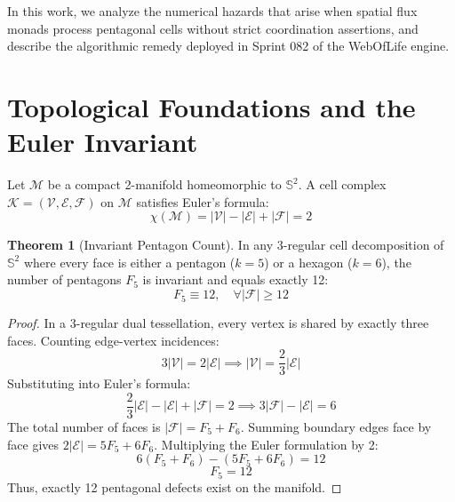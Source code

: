 \documentclass[10pt,twocolumn,letterpaper]{article}
\theoremstyle{definition}
\newtheorem{theorem}{Theorem}
\begin{document}
In this work, we analyze the numerical hazards that arise when spatial flux monads process pentagonal cells without strict coordination assertions, and describe the algorithmic remedy deployed in Sprint 082 of the WebOfLife engine.

\section{Topological Foundations and the Euler Invariant}

Let $\mathcal{M}$ be a compact 2-manifold homeomorphic to $\mathbb{S}^2$. A cell complex $\mathcal{K} = (\mathcal{V}, \mathcal{E}, \mathcal{F})$ on $\mathcal{M}$ satisfies Euler's formula:
\begin{equation}
\chi(\mathcal{M}) = |\mathcal{V}| - |\mathcal{E}| + |\mathcal{F}| = 2
\end{equation}

\begin{theorem}[Invariant Pentagon Count]
In any 3-regular cell decomposition of $\mathbb{S}^2$ where every face is either a pentagon ($k=5$) or a hexagon ($k=6$), the number of pentagons $F_5$ is invariant and equals exactly 12:
\begin{equation}
F_5 \equiv 12, \quad \forall |\mathcal{F}| \ge 12
\end{equation}
\end{theorem}

\begin{proof}
In a 3-regular dual tessellation, every vertex is shared by exactly three faces. Counting edge-vertex incidences:
\begin{equation}
3|\mathcal{V}| = 2|\mathcal{E}| \implies |\mathcal{V}| = \frac{2}{3}|\mathcal{E}|
\end{equation}
Substituting into Euler's formula:
\begin{equation}
\frac{2}{3}|\mathcal{E}| - |\mathcal{E}| + |\mathcal{F}| = 2 \implies 3|\mathcal{F}| - |\mathcal{E}| = 6
\end{equation}
The total number of faces is $|\mathcal{F}| = F_5 + F_6$. Summing boundary edges face by face gives $2|\mathcal{E}| = 5F_5 + 6F_6$. Multiplying the Euler formulation by 2:
\begin{equation}
6(F_5 + F_6) - (5F_5 + 6F_6) = 12
\end{equation}
\begin{equation}
F_5 = 12
\end{equation}
Thus, exactly 12 pentagonal defects exist on the manifold.
\end{proof}
\end{document}
